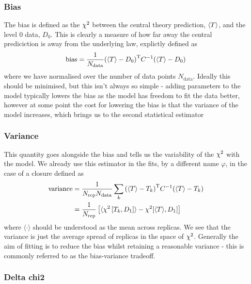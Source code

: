 \subsubsection*{Bias}

The bias is defined as the $\chi^{2}$ between the central theory prediction, $\langle T \rangle$,
and the level 0 data, $D_{0}$. This is clearly a measure of how far away the
central prediciction is away from the underlying law, explictly defined as
%
\begin{equation}
    \mathrm{bias} = \frac{1}{N_{\mathrm{data}}} {(\langle T \rangle - D_{0})}^{\mathrm{T}} C^{-1} (\langle T \rangle - D_{0})
\end{equation}
%
where we have normalised over the number of data points $N_{\mathrm{data}}$. Ideally this should
be minimised, but this isn't always so simple - adding parameters to the model
typically lowers the bias as the model has freedom to fit the data better, however at some point the
cost for lowering the bias is that the variance of the model increases, which brings us to the second
statistical estimator

\subsubsection*{Variance}

This quantity goes alongside the bias and tells us the variability of the $\chi^{2}$ with the model. We
already use this estimator in the fits, by a different name $\varphi$, in the case of a closure
defined as
%
\begin{equation}
    \begin{split}
        \mathrm{variance} &= \frac{1}{N_{\mathrm{rep}} N_{\mathrm{data}}} \sum_{k} {(\langle T \rangle - T_{k})}^{\mathrm{T}} C^{-1} (\langle T \rangle - T_{k}) \\
        &= \frac{1}{N_{\mathrm{rep}}} \left[ \langle \chi^{2} \left[ T_{k}, D_{1} \right] \rangle - \chi^{2}[\langle T \rangle, D_{1}] \right]
    \end{split}
\end{equation}
%
where $\langle \cdot \rangle$ should be understood as the mean across replicas. We see
that the variance is just the average spread of replicas in the space of $\chi^{2}$.
Generally the aim of fitting is to reduce the bias whilst retaining a reasonable
variance - this is commonly referred to as the bias-variance tradeoff.

\subsubsection*{Delta chi2}

